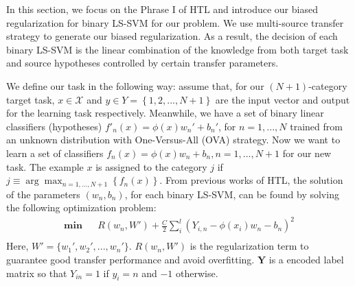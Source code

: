 

In this section, we focus on the Phrase I of HTL and introduce our biased regularization for binary LS-SVM for our problem. We use multi-source transfer strategy to generate our biased regularization. As a result, the decision of each binary LS-SVM is the linear combination of the knowledge from both target task and source hypotheses controlled by certain transfer parameters.

We define our task in the following way: assume that, for our $(N+1)$-category target task, ${x} \in \mathcal{X}$ and ${y} \in Y=\left\{1,2,...,N+1\right\}$ are the input vector and output for the learning task respectively. Meanwhile, we have a set of binary linear classifiers (hypotheses) $f'_n(x)=\phi(x)w_n'+b_n'$, for $n=1,...,N$ trained from an unknown distribution with One-Versus-All (OVA) strategy.  Now we want to learn a set of classifiers $f_n(x)=\phi(x)w_n+b_n, n=1,...,N+1$ for our new task. The example $x$ is assigned to the category $j$ if $j \equiv \arg {\max _{n = 1,...,N+1}}\left\{{f_n}(x)\right\}$. From previous works of HTL, the solution of the parameters $(w_n,b_n)$, for each binary LS-SVM, can be found by solving the following optimization problem:
\begin{equation*}
\begin{aligned}
\textbf{min} && R({w_n,W'}) + \frac{C}{2}\sum\limits_i^l {({Y_{i,n}} - \phi ({x_i}){w_n} - {b_n})^2} \\
\end{aligned}
\end{equation*}
Here, $W'=\{w_1',w_2',...,w_n'\}$. $R({w_n,W'})$ is the regularization term to guarantee good transfer performance and avoid overfitting. $\mathbf{Y}$ is a encoded label matrix so that $Y_{in}=1$ if $y_i=n$ and $-1$ otherwise.



